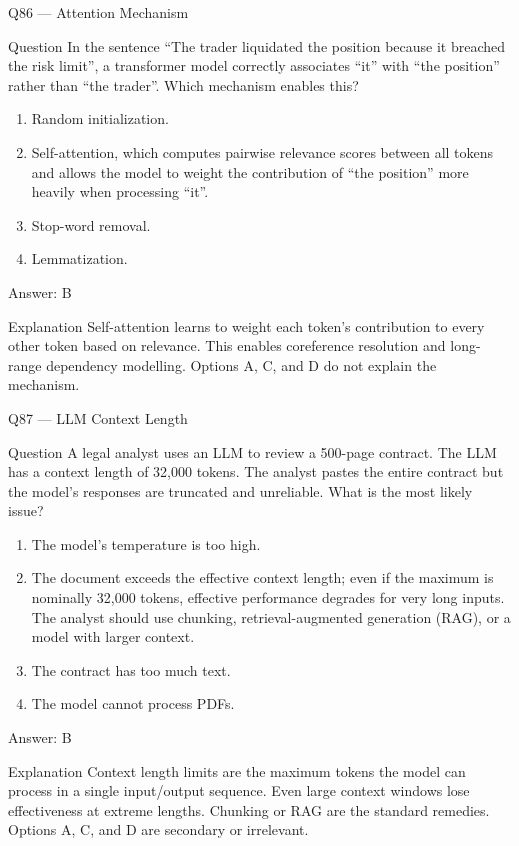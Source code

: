 \documentclass[aspectratio=169,8pt]{beamer}
\begin{document}
\begin{frame}{Q86 --- Attention Mechanism}
\begin{block}{Question}
In the sentence ``The trader liquidated the position because it breached the risk limit'', a transformer model correctly associates ``it'' with ``the position'' rather than ``the trader''. Which mechanism enables this?
\end{block}
\begin{enumerate}
\item Random initialization.
\item Self-attention, which computes pairwise relevance scores between all tokens and allows the model to weight the contribution of ``the position'' more heavily when processing ``it''.
\item Stop-word removal.
\item Lemmatization.
\end{enumerate}
\begin{exampleblock}{Answer: B}\end{exampleblock}
\begin{block}{Explanation}
Self-attention learns to weight each token's contribution to every other token based on relevance. This enables coreference resolution and long-range dependency modelling. Options A, C, and D do not explain the mechanism.
\end{block}
\end{frame}

\begin{frame}{Q87 --- LLM Context Length}
\begin{block}{Question}
A legal analyst uses an LLM to review a 500-page contract. The LLM has a context length of 32,000 tokens. The analyst pastes the entire contract but the model's responses are truncated and unreliable. What is the most likely issue?
\end{block}
\begin{enumerate}
\item The model's temperature is too high.
\item The document exceeds the effective context length; even if the maximum is nominally 32,000 tokens, effective performance degrades for very long inputs. The analyst should use chunking, retrieval-augmented generation (RAG), or a model with larger context.
\item The contract has too much text.
\item The model cannot process PDFs.
\end{enumerate}
\begin{exampleblock}{Answer: B}\end{exampleblock}
\begin{block}{Explanation}
Context length limits are the maximum tokens the model can process in a single input/output sequence. Even large context windows lose effectiveness at extreme lengths. Chunking or RAG are the standard remedies. Options A, C, and D are secondary or irrelevant.
\end{block}
\end{frame}
\end{document}
